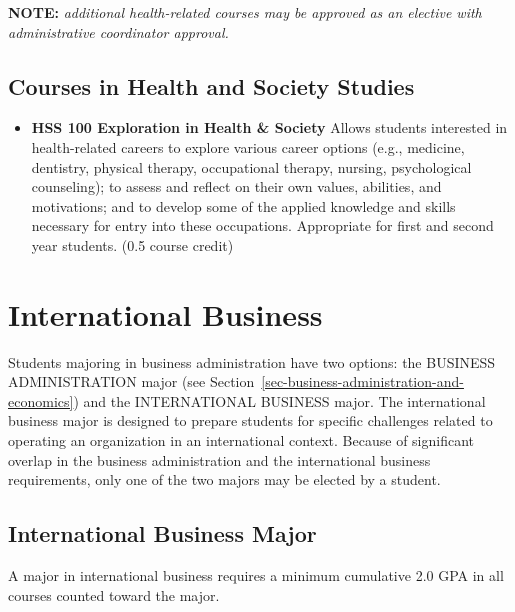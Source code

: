 \documentclass[
  letterpaper,
]{scrbook}
\providecommand{\tightlist}{%
  \setlength{\itemsep}{0pt}\setlength{\parskip}{0pt}}
\begin{document}
\textbf{NOTE:} \emph{additional health-related courses may be approved
as an elective with administrative coordinator approval.}

\subsection{Courses in Health and Society
Studies}\label{courses-in-health-and-society-studies}

\begin{itemize}
\tightlist
\item
  \textbf{HSS 100 Exploration in Health \& Society} Allows students
  interested in health-related careers to explore various career options
  (e.g., medicine, dentistry, physical therapy, occupational therapy,
  nursing, psychological counseling); to assess and reflect on their own
  values, abilities, and motivations; and to develop some of the applied
  knowledge and skills necessary for entry into these occupations.
  Appropriate for first and second year students. (0.5 course credit)
\end{itemize}

\section{International Business}\label{sec-international-business}

Students majoring in business administration have two options: the
BUSINESS ADMINISTRATION major (see
Section~\ref{sec-business-administration-and-economics}) and the
INTERNATIONAL BUSINESS major. The international business major is
designed to prepare students for specific challenges related to
operating an organization in an international context. Because of
significant overlap in the business administration and the international
business requirements, only one of the two majors may be elected by a
student.

\subsection{International Business
Major}\label{international-business-major}

A major in international business requires a minimum cumulative 2.0 GPA
in all courses counted toward the major.
\end{document}
